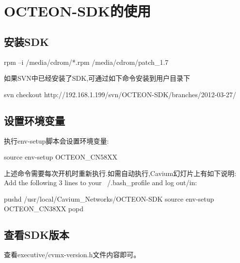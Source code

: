 \section{OCTEON-SDK的使用}

\subsection{安装SDK}
\begin{shellcmd}
rpm –i /media/cdrom/*.rpm
/media/cdrom/patch_1.7
\end{shellcmd}
如果SVN中已经安装了SDK,可通过如下命令安装到用户目录下
\begin{shellcmd}
svn checkout http://192.168.1.199/svn/OCTEON-SDK/branches/2012-03-27/
\end{shellcmd}

\subsection{设置环境变量}
执行env-setup脚本会设置环境变量:
\begin{shellcmd}
source env-setup OCTEON_CN58XX
\end{shellcmd}
上述命令需要每次开机时重新执行.如需自动执行,Cavium幻灯片上有如下说明:
Add the following 3 lines to your ~/.bash\_profile and log out/in:
\begin{shellcmd}
pushd /usr/local/Cavium_Networks/OCTEON-SDK
source env-setup OCTEON_CN38XX
popd
\end{shellcmd}


\subsection{查看SDK版本}
查看executive/cvmx-version.h文件内容即可。

